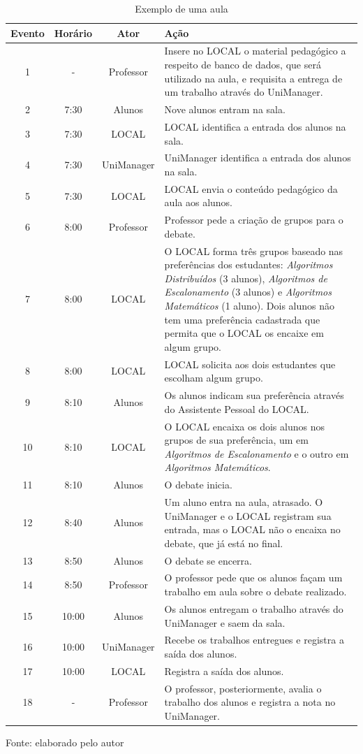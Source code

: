 \begin{table}\centering\footnotesize
  \caption{Exemplo de uma aula}
    \begin{tabular*}{1\textwidth}{@{}cccp{11cm}@{}}
    \toprule
    Evento & Horário & Ator & Ação \\
    \midrule
    1 & - & Professor & Insere no LOCAL o material pedagógico a respeito de banco de dados, que será utilizado na aula, e requisita a entrega de um trabalho através do UniManager. \\
    2 & 7:30 & Alunos & Nove alunos entram na sala. \\
    3 & 7:30 & LOCAL & LOCAL identifica a entrada dos alunos na sala. \\
    4 & 7:30 & UniManager & UniManager identifica a entrada dos alunos na sala. \\
    5 & 7:30 & LOCAL & LOCAL envia o conteúdo pedagógico da aula aos alunos. \\
    6 & 8:00 & Professor & Professor pede a criação de grupos para o debate. \\
    7 & 8:00 & LOCAL & O LOCAL forma três grupos baseado nas preferências dos estudantes: {\em Algoritmos Distribuídos} (3 alunos), {\em Algoritmos de Escalonamento} (3 alunos) e {\em Algoritmos Matemáticos} (1 aluno). Dois alunos não tem uma preferência cadastrada que permita que o LOCAL os encaixe em algum grupo. \\
    8 & 8:00 & LOCAL & LOCAL solicita aos dois estudantes que escolham algum grupo. \\
    9 & 8:10 & Alunos & Os alunos indicam sua preferência através do Assistente Pessoal do LOCAL. \\
    10 & 8:10 & LOCAL & O LOCAL encaixa os dois alunos nos grupos de sua preferência, um em {\em Algoritmos de Escalonamento} e o outro em {\em Algoritmos Matemáticos}. \\
    11 & 8:10 & Alunos & O debate inicia. \\
    12 & 8:40 & Alunos & Um aluno entra na aula, atrasado. O UniManager e o LOCAL registram sua entrada, mas o LOCAL não o encaixa no debate, que já está no final. \\
    13 & 8:50 & Alunos & O debate se encerra. \\
    14 & 8:50 & Professor & O professor pede que os alunos façam um trabalho em aula sobre o debate realizado. \\
    15 & 10:00 & Alunos & Os alunos entregam o trabalho através do UniManager e saem da sala. \\
    16 & 10:00 & UniManager & Recebe os trabalhos entregues e registra a saída dos alunos. \\
    17 & 10:00 & LOCAL & Registra a saída dos alunos. \\
    18 & - & Professor & O professor, posteriormente, avalia o trabalho dos alunos e registra a nota no UniManager. \\
    \bottomrule
  \end{tabular*}
  \label{tab:aula}
  
Fonte: elaborado pelo autor
\end{table}

